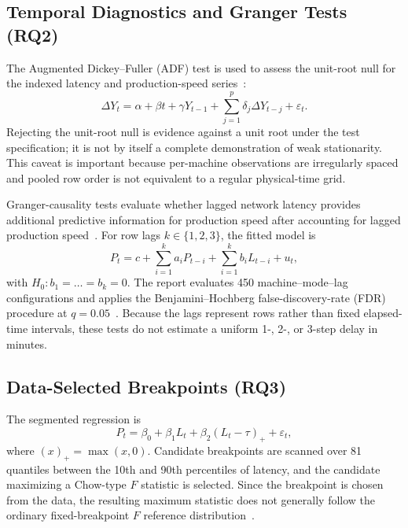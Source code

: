 \documentclass[conference]{IEEEtran}
\begin{document}
\subsection{Temporal Diagnostics and Granger Tests (RQ2)}
The Augmented Dickey--Fuller (ADF) test is used to assess the unit-root null for the indexed latency and production-speed series~\cite{seabold2010statsmodels, dickey1979distribution}:
\begin{equation}
\Delta Y_t = \alpha + \beta t + \gamma Y_{t-1} + \sum_{j=1}^p \delta_j \Delta Y_{t-j} + \varepsilon_t.
\label{eq:adf}
\end{equation}
Rejecting the unit-root null is evidence against a unit root under the test specification; it is not by itself a complete demonstration of weak stationarity. This caveat is important because per-machine observations are irregularly spaced and pooled row order is not equivalent to a regular physical-time grid.

Granger-causality tests evaluate whether lagged network latency provides additional predictive information for production speed after accounting for lagged production speed~\cite{granger1969investigating}. For row lags $k \in \{1, 2, 3\}$, the fitted model is
\begin{equation}
P_t = c + \sum_{i=1}^k a_i P_{t-i} + \sum_{i=1}^k b_i L_{t-i} + u_t,
\label{eq:granger}
\end{equation}
with $H_0: b_1 = \dots = b_k = 0$. The report evaluates 450 machine--mode--lag configurations and applies the Benjamini--Hochberg false-discovery-rate (FDR) procedure at $q = 0.05$~\cite{benjamini1995controlling}. Because the lags represent rows rather than fixed elapsed-time intervals, these tests do not estimate a uniform 1-, 2-, or 3-step delay in minutes.

\subsection{Data-Selected Breakpoints (RQ3)}
The segmented regression is
\begin{equation}
P_t = \beta_0 + \beta_1 L_t + \beta_2 (L_t - \tau)_+ + \varepsilon_t,
\label{eq:segmented}
\end{equation}
where $(x)_+ = \max(x, 0)$. Candidate breakpoints are scanned over 81 quantiles between the 10th and 90th percentiles of latency, and the candidate maximizing a Chow-type $F$ statistic is selected. Since the breakpoint is chosen from the data, the resulting maximum statistic does not generally follow the ordinary fixed-breakpoint $F$ reference distribution~\cite{andrews1993tests, hansen2000sample}.
\end{document}
